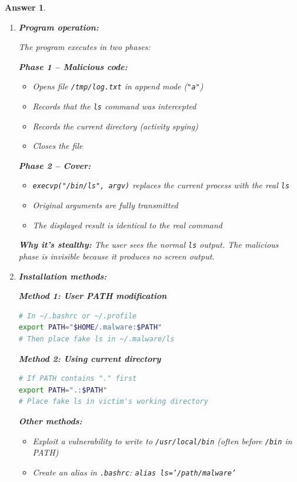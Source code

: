 \documentclass[a4paper,11pt]{article}
\theoremstyle{plain}
\newtheorem{correction}{Answer}
\theoremstyle{definition}
\begin{document}
\begin{correction}

\begin{enumerate}
\item \textbf{Program operation:}

The program executes in two phases:

\textbf{Phase 1 -- Malicious code:}
\begin{itemize}
\item Opens file \texttt{/tmp/log.txt} in append mode (\texttt{"a"})
\item Records that the \texttt{ls} command was intercepted
\item Records the current directory (activity spying)
\item Closes the file
\end{itemize}

\textbf{Phase 2 -- Cover:}
\begin{itemize}
\item \texttt{execvp("/bin/ls", argv)} replaces the current process with the real \texttt{ls}
\item Original arguments are fully transmitted
\item The displayed result is identical to the real command
\end{itemize}

\textbf{Why it's stealthy:} The user sees the normal \texttt{ls} output. The malicious phase is invisible because it produces no screen output.

\item \textbf{Installation methods:}

\textbf{Method 1: User PATH modification}
\begin{lstlisting}[language=bash,numbers=none]
# In ~/.bashrc or ~/.profile
export PATH="$HOME/.malware:$PATH"
# Then place fake ls in ~/.malware/ls
\end{lstlisting}

\textbf{Method 2: Using current directory}
\begin{lstlisting}[language=bash,numbers=none]
# If PATH contains "." first
export PATH=".:$PATH"
# Place fake ls in victim's working directory
\end{lstlisting}

\textbf{Other methods:}
\begin{itemize}
\item Exploit a vulnerability to write to \texttt{/usr/local/bin} (often before \texttt{/bin} in PATH)
\item Create an alias in \texttt{.bashrc}: \texttt{alias ls='/path/malware'}
\end{itemize}


\end{enumerate}
\end{correction}
\end{document}
